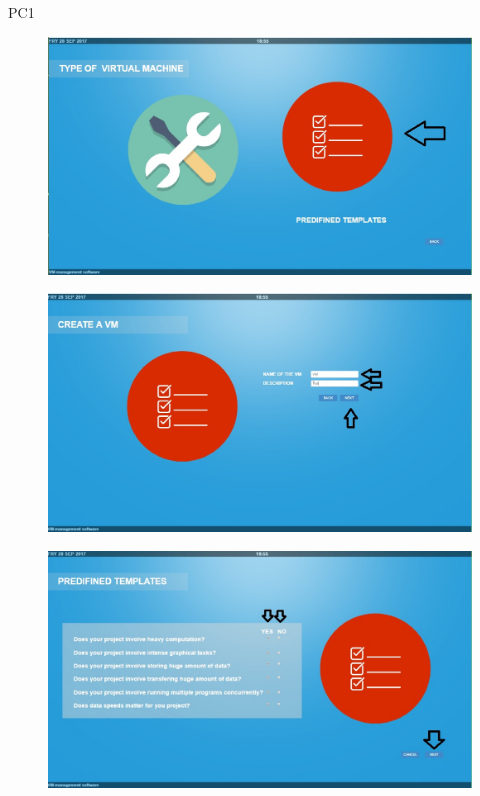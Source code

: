 \begin{lyxlist}{PC1}
\begin{figure}[H]
\centering
\includegraphics[width=170mm]{images/createVMTemp2.eps}
\caption{\label{overflow}}
\end{figure}

\begin{figure}[H]
\centering
\includegraphics[width=170mm]{images/createVMTemp3.eps}
\caption{\label{overflow}}
\end{figure}

\begin{figure}[H]
\centering
\includegraphics[width=170mm]{images/createVMTemp4.eps}
\caption{\label{overflow}}
\end{figure}



\end{lyxlist}

